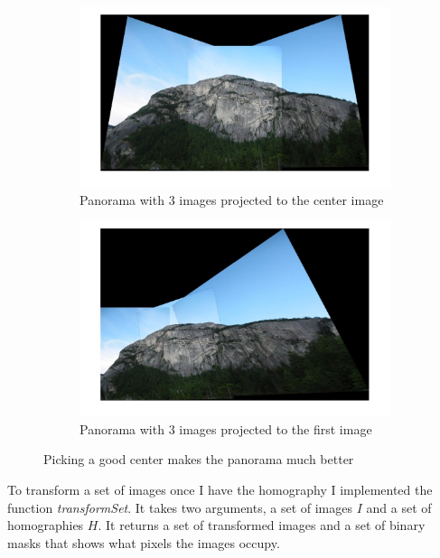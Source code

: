 \documentclass[12pt]{article}
\begin{document}
\begin{figure}[t!]
    \begin{subfigure}[t]{0.5\textwidth}
        \centering
        \includegraphics[width=\linewidth]{img/set2_panorama3}
        \caption{Panorama with 3 images projected to the center image}
        \label{fig_set2_pan1}
    \end{subfigure}
    \begin{subfigure}[t]{0.5\textwidth}
        \centering
        \includegraphics[width=\linewidth]{img/set2_panorama2}
        \caption{Panorama with 3 images projected to the first image}
        \label{fig_set2_pan2}
    \end{subfigure}
    \caption{Picking a good center makes the panorama much better}
    \label{fig_pan_center}
\end{figure}

To transform a set of images once I have the homography I implemented the function \textit{transformSet}. It takes two arguments, a set of images $I$ and a set of homographies $H$. It returns a set of transformed images and a set of binary masks that shows what pixels the images occupy.
\end{document}
